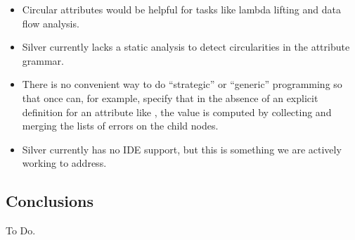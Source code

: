 \begin{itemize}
\item Circular attributes would be helpful for tasks like lambda
  lifting and data flow analysis.
\item Silver currently lacks a static analysis to detect circularities
  in the attribute grammar.
\item There is no convenient way to do ``strategic'' or ``generic''
  programming so that once can, for example, specify that in the
  absence of an explicit definition for an attribute like
  , the value is computed by collecting and merging the
  lists of errors on the child nodes.
\item Silver currently has no IDE support, but this is something we
  are actively working to address.
\end{itemize}

\subsection{Conclusions}\label{silver:sec:conclusion}

To Do.
